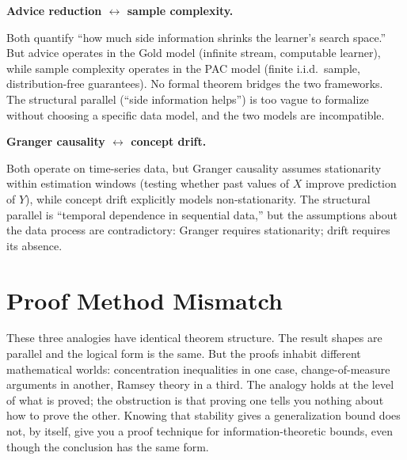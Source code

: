 \begin{obstbox}
\textbf{Advice reduction $\leftrightarrow$ sample complexity.}

\medskip\noindent
Both quantify ``how much side information shrinks the learner's search
space.'' But advice operates in the Gold model (infinite stream,
computable learner), while sample complexity operates in the PAC model
(finite i.i.d.\ sample, distribution-free guarantees). No formal theorem
bridges the two frameworks. The structural parallel (``side information
helps'') is too vague to formalize without choosing a specific data
model, and the two models are incompatible.

\hfill\cite{KaufmannStephan2001}
\end{obstbox}

\begin{obstbox}
\textbf{Granger causality $\leftrightarrow$ concept drift.}

\medskip\noindent
Both operate on time-series data, but Granger causality assumes
stationarity within estimation windows (testing whether past values
of $X$ improve prediction of $Y$), while concept drift explicitly
models non-stationarity. The structural parallel is ``temporal
dependence in sequential data,'' but the assumptions about the data
process are contradictory: Granger requires stationarity; drift requires
its absence.
\end{obstbox}



\section{Proof Method Mismatch}
\label{sec:proof-method}

These three analogies have identical theorem structure. The result shapes
are parallel and the logical form is the same. But the proofs inhabit
different mathematical worlds: concentration inequalities in one case,
change-of-measure arguments in another, Ramsey theory in a third. The
analogy holds at the level of what is proved; the obstruction is that
proving one tells you nothing about how to prove the other. Knowing that
stability gives a generalization bound does not, by itself, give you a
proof technique for information-theoretic bounds, even though the conclusion
has the same form.


